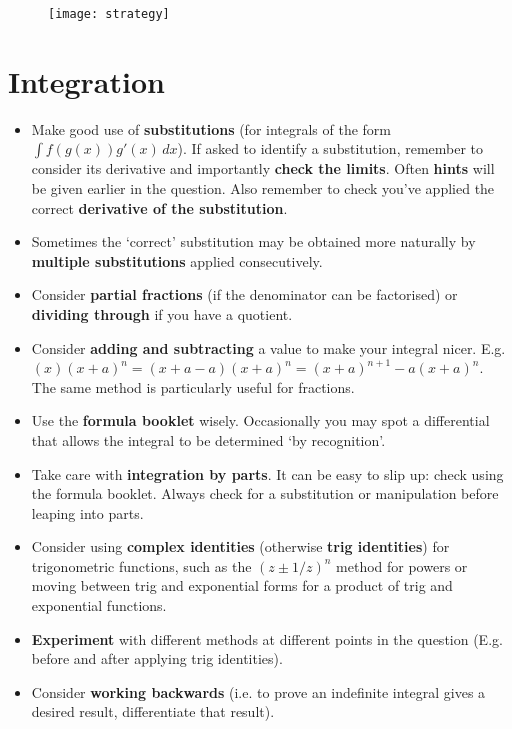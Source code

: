 \documentclass[9pt]{extarticle}
\begin{document}
	\begin{figure}[p]
		\begin{center}
			\texttt{[image: strategy]}
		\end{center}
	\end{figure}
	
	\clearpage
	
	\section{Integration}
	
	\begin{itemize}
		\item Make good use of \textbf{substitutions} (for integrals of the form $\int f(g(x))g'(x) \,dx$). If asked to identify a substitution, remember to consider its derivative and importantly \textbf{check the limits}. Often \textbf{hints} will be given earlier in the question. Also remember to check you've applied the correct \textbf{derivative of the substitution}.
		\item Sometimes the `correct' substitution may be obtained more naturally by \textbf{multiple substitutions} applied consecutively.
		\item Consider \textbf{partial fractions} (if the denominator can be factorised) or \textbf{dividing through} if you have a quotient.
		\item Consider \textbf{adding and subtracting} a value to make your integral nicer. E.g. $(x)(x+a)^n = (x+a-a)(x+a)^n = (x+a)^{n+1} - a(x+a)^n$. The same method is particularly useful for fractions.
		\item Use the \textbf{formula booklet} wisely. Occasionally you may spot a differential that allows the integral to be determined `by recognition'.
		\item Take care with \textbf{integration by parts}. It can be easy to slip up: check using the formula booklet. Always check for a substitution or manipulation before leaping into parts.
		\item Consider using \textbf{complex identities} (otherwise \textbf{trig identities}) for trigonometric functions, such as the $(z \pm 1/z)^n$ method for powers or moving between trig and exponential forms for a product of trig and exponential functions.
		\item \textbf{Experiment} with different methods at different points in the question (E.g. before and after applying trig identities).
		\item Consider \textbf{working backwards} (i.e. to prove an indefinite integral gives a desired result, differentiate that result).

\end{itemize}
\end{document}
